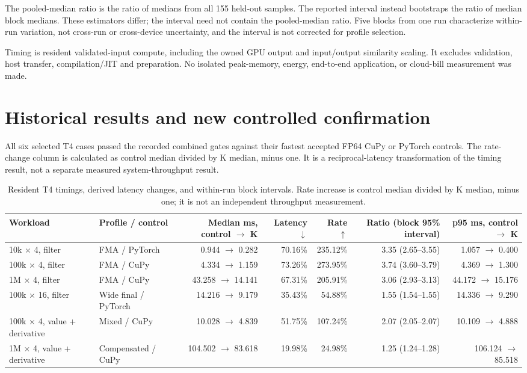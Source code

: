 \documentclass[10pt]{article}
\begin{document}
The pooled-median ratio is the ratio of medians from all 155 held-out samples. The reported interval instead bootstraps the ratio of median block medians. These estimators differ; the interval need not contain the pooled-median ratio. Five blocks from one run characterize within-run variation, not cross-run or cross-device uncertainty, and the interval is not corrected for profile selection.

Timing is resident validated-input compute, including the owned GPU output and input/output similarity scaling. It excludes validation, host transfer, compilation/JIT and preparation. No isolated peak-memory, energy, end-to-end application, or cloud-bill measurement was made.

\section{Historical results and new controlled confirmation}

All six selected T4 cases passed the recorded combined gates against their fastest accepted FP64 CuPy or PyTorch controls. The rate-change column is calculated as control median divided by K median, minus one. It is a reciprocal-latency transformation of the timing result, not a separate measured system-throughput result.

\begin{table}[htbp]
\centering
\scriptsize
\begin{tabular}{@{}llrrrrr@{}}
\toprule
Workload & Profile / control & Median ms, control $\to$ K & Latency $\downarrow$ & Rate $\uparrow$ & Ratio (block 95\% interval) & p95 ms, control $\to$ K \\
\midrule
10k $\times$ 4, filter & FMA / PyTorch & 0.944 $\to$ 0.282 & 70.16\% & 235.12\% & 3.35 (2.65--3.55) & 1.057 $\to$ 0.400 \\
100k $\times$ 4, filter & FMA / CuPy & 4.334 $\to$ 1.159 & 73.26\% & 273.95\% & 3.74 (3.60--3.79) & 4.369 $\to$ 1.300 \\
1M $\times$ 4, filter & FMA / CuPy & 43.258 $\to$ 14.141 & 67.31\% & 205.91\% & 3.06 (2.93--3.13) & 44.172 $\to$ 15.176 \\
100k $\times$ 16, filter & Wide final / PyTorch & 14.216 $\to$ 9.179 & 35.43\% & 54.88\% & 1.55 (1.54--1.55) & 14.336 $\to$ 9.290 \\
100k $\times$ 4, value + derivative & Mixed / CuPy & 10.028 $\to$ 4.839 & 51.75\% & 107.24\% & 2.07 (2.05--2.07) & 10.109 $\to$ 4.888 \\
1M $\times$ 4, value + derivative & Compensated / CuPy & 104.502 $\to$ 83.618 & 19.98\% & 24.98\% & 1.25 (1.24--1.28) & 106.124 $\to$ 85.518 \\
\bottomrule
\end{tabular}
\caption{Resident T4 timings, derived latency changes, and within-run block intervals. Rate increase is control median divided by K median, minus one; it is not an independent throughput measurement.}
\label{tab:t4}
\end{table}
\end{document}
